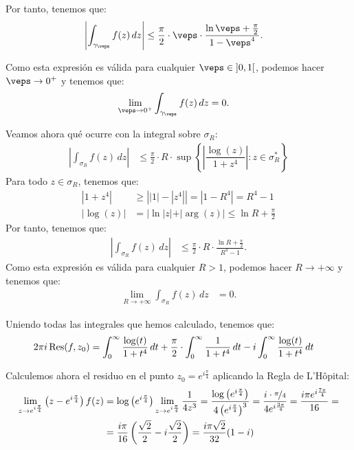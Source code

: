 \begin{ejercicio}
    Por tanto, tenemos que:
    \begin{align*}
        \left|\int_{\gamma_{\veps}} f(z) \, dz\right| &\leq \frac{\pi}{2}\cdot \veps \cdot \frac{\ln\veps + \frac{\pi}{2}}{1 - \veps^4}.
    \end{align*}

    Como esta expresión es válida para cualquier $\veps\in \left]0, 1\right[$, podemos hacer $\veps \to 0^+$ y tenemos que:
    \begin{align*}
        \lim_{\veps\to 0^+} \int_{\gamma_{\veps}} f(z) \, dz &= 0.
    \end{align*}

    Veamos ahora qué ocurre con la integral sobre $\sigma_R$:
    \begin{align*}
        \left|\int_{\sigma_R} f(z) \, dz\right| &\leq \frac{\pi}{2}\cdot R \cdot \sup\left\{\left|\dfrac{\log(z)}{1 + z^4}\right| : z\in \sigma_R^*\right\}
    \end{align*}
    Para todo $z\in \sigma_R$, tenemos que:
    \begin{align*}
        |1+z^4| &\geq \left||1| - |z^4|\right| = \left|1 - R^4\right| = R^4 - 1\\
        |\log(z)| &= |\ln|z| + |\arg(z)|\leq \ln R + \frac{\pi}{2}
    \end{align*}
    Por tanto, tenemos que:
    \begin{align*}
        \left|\int_{\sigma_R} f(z) \, dz\right| &\leq \frac{\pi}{2}\cdot R \cdot \frac{\ln R + \frac{\pi}{2}}{R^4 - 1}.
    \end{align*}
    Como esta expresión es válida para cualquier $R > 1$, podemos hacer $R \to +\infty$ y tenemos que:
    \begin{align*}
        \lim_{R\to+\infty} \int_{\sigma_R} f(z) \, dz &= 0.
    \end{align*}

    Uniendo todas las integrales que hemos calculado, tenemos que:
    \begin{align*}
        2\pi i\operatorname{Res}(f, z_0) &= \int_0^{\infty} \frac{\log(t)}{1 + t^4} \, dt + \frac{\pi}{2}\cdot \int_{0}^{\infty} \frac{1}{1 + t^4} \, dt - i\int_0^{\infty} \frac{\log(t)}{1 + t^4} \, dt
    \end{align*}

    Calculemos ahora el residuo en el punto $z_0 = e^{i\frac{\pi}{4}}$ aplicando la Regla de L'Hôpital:
    \begin{align*}
        \lim_{z\to e^{i\frac{\pi}{4}}} \left(z - e^{i\frac{\pi}{4}}\right)f(z) &= \log\left(e^{i\frac{\pi}{4}}\right) \lim_{z\to e^{i\frac{\pi}{4}}} \dfrac{1}{4z^3}
        = \dfrac{\log\left(e^{i\frac{\pi}{4}}\right)}{4\left(e^{i\frac{\pi}{4}}\right)^3}
        = \dfrac{i\cdot \nicefrac{\pi}{4}}{4 e^{i\frac{3\pi}{4}}}
        = \dfrac{i\pi e^{i\frac{7\pi}{4}}}{16}
        =\\&= \dfrac{i\pi}{16}\left(\dfrac{\sqrt{2}}{2} - i\frac{\sqrt{2}}{2}\right)
        = \dfrac{i\pi\sqrt{2}}{32}(1-i)
    \end{align*}


\end{ejercicio}
